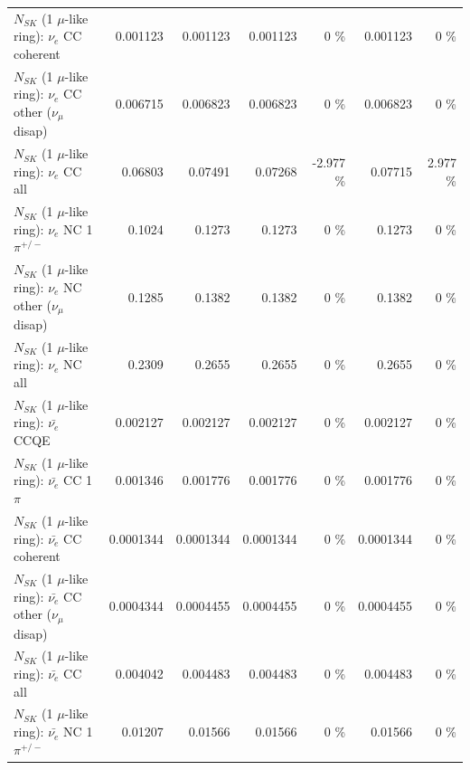 \begin{table}
\begin{tabular}{| l | r | r | r  r | r  r |}
                               $N_{SK}$ (1 $\mu$-like ring): $\nu_e$ CC coherent &        0.001123 &        0.001123 &        0.001123 &        0 \%  &        0.001123 &        0 \%  \\ 
                $N_{SK}$ (1 $\mu$-like ring): $\nu_e$ CC other ($\nu_\mu$ disap) &        0.006715 &        0.006823 &        0.006823 &        0 \%  &        0.006823 &        0 \%  \\ 
                                  $N_{SK}$ (1 $\mu$-like ring): $\nu_{e}$ CC all &         0.06803 &         0.07491 &         0.07268 &   -2.977 \%  &         0.07715 &    2.977 \%  \\ 
\hline
                           $N_{SK}$ (1 $\mu$-like ring): $\nu_e$ NC 1$\pi^{+/-}$ &          0.1024 &          0.1273 &          0.1273 &        0 \%  &          0.1273 &        0 \%  \\ 
                $N_{SK}$ (1 $\mu$-like ring): $\nu_e$ NC other ($\nu_\mu$ disap) &          0.1285 &          0.1382 &          0.1382 &        0 \%  &          0.1382 &        0 \%  \\ 
                                  $N_{SK}$ (1 $\mu$-like ring): $\nu_{e}$ NC all &          0.2309 &          0.2655 &          0.2655 &        0 \%  &          0.2655 &        0 \%  \\ 
\hline
\hline
\hline
                                $N_{SK}$ (1 $\mu$-like ring): $\bar{\nu_e}$ CCQE &        0.002127 &        0.002127 &        0.002127 &        0 \%  &        0.002127 &        0 \%  \\ 
                           $N_{SK}$ (1 $\mu$-like ring): $\bar{\nu_e}$ CC 1$\pi$ &        0.001346 &        0.001776 &        0.001776 &        0 \%  &        0.001776 &        0 \%  \\ 
                         $N_{SK}$ (1 $\mu$-like ring): $\bar{\nu_e}$ CC coherent &       0.0001344 &       0.0001344 &       0.0001344 &        0 \%  &       0.0001344 &        0 \%  \\ 
          $N_{SK}$ (1 $\mu$-like ring): $\bar{\nu_e}$ CC other ($\nu_\mu$ disap) &       0.0004344 &       0.0004455 &       0.0004455 &        0 \%  &       0.0004455 &        0 \%  \\ 
                            $N_{SK}$ (1 $\mu$-like ring): $\bar{\nu_{e}}$ CC all &        0.004042 &        0.004483 &        0.004483 &        0 \%  &        0.004483 &        0 \%  \\ 
\hline
                     $N_{SK}$ (1 $\mu$-like ring): $\bar{\nu_e}$ NC 1$\pi^{+/-}$ &         0.01207 &         0.01566 &         0.01566 &        0 \%  &         0.01566 &        0 \%  \\ 

\end{tabular}
\end{table}
